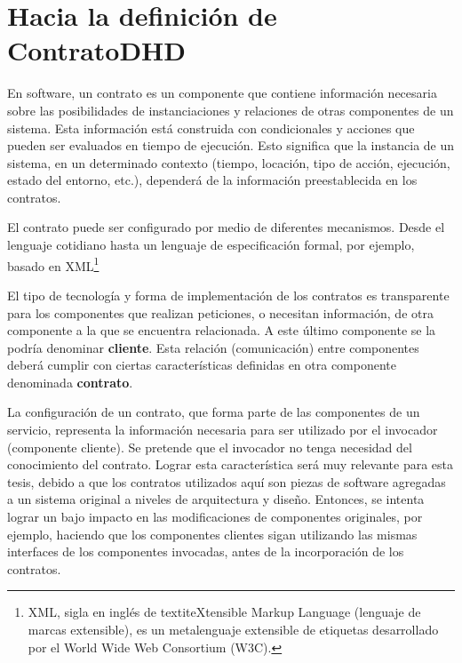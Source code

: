 \section {Hacia la definición de ContratoDHD}\label{sec:Hacia_la_definición_de_ContratosDHD}

En software, un contrato es un componente que contiene información necesaria sobre las posibilidades de instanciaciones y relaciones de otras componentes de un sistema. Esta información está construida con condicionales y acciones que pueden ser evaluados en tiempo de ejecución. Esto significa que la instancia de un sistema, en un determinado contexto (tiempo, locación, tipo de acción, ejecución, estado del entorno, etc.), dependerá de la información preestablecida en los contratos. 


El contrato puede ser configurado por medio de diferentes mecanismos. Desde el lenguaje cotidiano hasta un lenguaje de especificación formal, por ejemplo, basado en XML\footnote {XML, sigla en inglés de textit{eXtensible Markup Language} (lenguaje de marcas extensible), es un metalenguaje extensible de etiquetas desarrollado por el World Wide Web Consortium (W3C).} 


El tipo de tecnología y forma de implementación de los contratos es transparente para los componentes que realizan peticiones, o necesitan información, de otra componente a la que se encuentra relacionada. A este último componente se la podría denominar \textbf{cliente}. Esta relación (comunicación) entre componentes deberá cumplir con ciertas características definidas en otra componente denominada \textbf{contrato}. 

La configuración de un contrato, que forma parte de las componentes de un servicio, representa la información necesaria para ser utilizado por el invocador (componente cliente). Se pretende que el invocador no tenga necesidad del conocimiento del contrato. Lograr esta característica será muy relevante para esta tesis, debido a que los contratos utilizados aquí son piezas de software agregadas a un sistema original a niveles de arquitectura y diseño. Entonces, se intenta lograr un bajo impacto en las modificaciones de componentes originales, por ejemplo, haciendo que los componentes clientes sigan utilizando las mismas interfaces de los componentes invocadas, antes de la incorporación de los contratos. 

